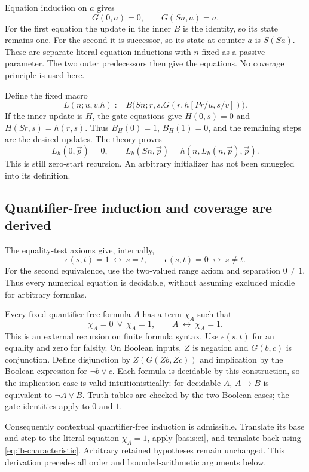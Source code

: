 Equation induction on $a$ gives
\[
                       G(0,a)=0,\qquad G(Sn,a)=a.
 \tag{Gate}\label{eq:ib-gate}
\]
For the first equation the update in the inner $B$ is the identity,
so its state remains one.  For the second it is successor, so its state
at counter $a$ is $S(Sa)$.  These are separate literal-equation inductions
with $n$ fixed as a passive parameter.  The two outer predecessors then
give the equations.  No coverage principle is used here.

Define the fixed macro
\[
 L(n;u,v.h):=
 B\bigl(Sn;r,s.G(r,h[Pr/u,s/v])\bigr).
 \tag{L}\label{eq:ib-L}
\]
If the inner update is $H$, the gate equations give
$H(0,s)=0$ and $H(Sr,s)=h(r,s)$.  Thus $B_H(0)=1$,
$B_H(1)=0$, and the remaining steps are the desired updates.  The
theory proves
\[
 L_h(0,\vec p)=0,\qquad
 L_h(Sn,\vec p)=h(n,L_h(n,\vec p),\vec p).
 \tag{L computation}\label{eq:ib-L-computation}
\]
This is still zero-start recursion.  An arbitrary initializer has
not been smuggled into its definition.

\subsection{Quantifier-free induction and coverage are derived}

The equality-test axioms give, internally,
\[
 \epsilon(s,t)=1\ \longleftrightarrow\ s=t,
 \qquad
 \epsilon(s,t)=0\ \longleftrightarrow\ s\ne t.
 \tag{Reflection}\label{eq:ib-equality-reflection}
\]
For the second equivalence, use the two-valued range axiom and separation
$0\ne1$.  Thus every numerical equation is decidable, without assuming
excluded middle for arbitrary formulas.

Every fixed quantifier-free formula $A$ has a term $\chi_A$ such that
\[
 \chi_A=0\ \vee\ \chi_A=1,
 \qquad A\ \longleftrightarrow\ \chi_A=1.
 \tag{Characteristic}\label{eq:ib-characteristic}
\]
This is an external recursion on finite formula syntax.  Use
$\epsilon(s,t)$ for an equality and zero for falsity.  On Boolean inputs,
$Z$ is negation and $G(b,c)$ is conjunction.  Define disjunction by
$Z(G(Zb,Zc))$ and implication by the Boolean expression for
$\neg b\vee c$.  Each formula is decidable by this construction, so
the implication case is valid intuitionistically: for decidable $A$,
$A\to B$ is equivalent to $\neg A\vee B$.  Truth tables are checked
by the two Boolean cases; the gate identities apply to $0$ and $1$.

Consequently contextual quantifier-free induction is admissible.
Translate its base and step to the literal equation $\chi_A=1$, apply
\eqref{basis:ei}, and translate back using
\eqref{eq:ib-characteristic}.  Arbitrary retained hypotheses remain
unchanged.  This derivation precedes all order and bounded-arithmetic
arguments below.

